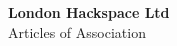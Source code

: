 


\begin{titlepage}
\begin{center}
{\bf \LARGE London Hackspace Ltd}\\[36pt]
{\Large Articles of Association}

\vfill

\end{center}
\end{titlepage}


